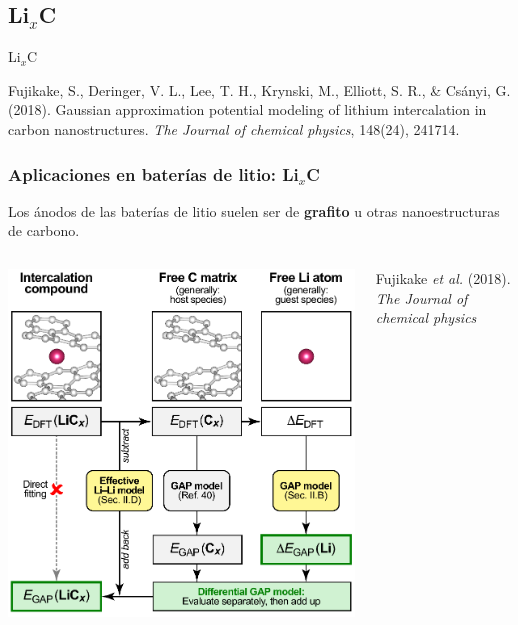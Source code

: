 \documentclass[aspectratio=169]{beamer}
\let\oldtextbf\textbf
\renewcommand{\textbf}[1]{\textcolor{nordblue}{\oldtextbf{#1}}}
\begin{document}
    \subsection{Li$_x$C}
    \begin{frame}
        \begin{center}
            {\huge Li$_x$C}
        \end{center}
        \tiny{
            Fujikake, S., Deringer, V. L., Lee, T. H., Krynski, M., 
            Elliott, S. R., \& Csányi, G. (2018). Gaussian approximation 
            potential modeling of lithium intercalation in carbon 
            nanostructures. \textit{The Journal of chemical physics}, 148(24), 241714.
        }
    \end{frame}
    
    \begin{frame}
        \frametitle{Aplicaciones en baterías de litio: Li$_x$C}
            
        Los ánodos de las baterías de litio suelen ser de \textbf{grafito} u otras
        nanoestructuras de carbono.
        
        \begin{columns}
            \begin{center}
                \includegraphics[width=0.9\columnwidth]{LiC-metodo.png}
            \end{center}
            \tiny{Fujikake \textit{et al.} (2018). \textit{The Journal of chemical
            physics}}


\end{columns}
\end{frame}
\end{document}
